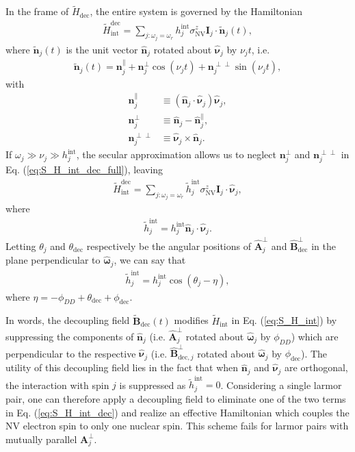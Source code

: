 \documentclass[twocolumn]{revtex4-1}
\renewcommand{\t}{\text} %
\newcommand{\p}[1]{\left(#1\right)} %
\renewcommand{\v}{\bm} %
\newcommand{\uv}[1]{\hat{\v{#1}}} %
\renewcommand{\c}{\cdot} %
\newcommand{\NV}{\t{NV}}
\begin{document}
In the frame of $\tilde H_{\t{dec}}$, the entire system is governed by
the Hamiltonian
\begin{align}
  \tilde H_{\t{int}}^{\t{dec}} = \sum_{j:\omega_j=\omega_r}
  h_j^{\t{int}}\sigma_\NV^z\v I_j\c\tilde{\v n}_j\p{t},
  \label{eq:S_H_int_dec_full}
\end{align}
where $\tilde{\v n}_j\p{t}$ is the unit vector $\uv n_j$ rotated about
$\uv\nu_j$ by $\nu_jt$, i.e.
\begin{align}
  \tilde{\v n}_j\p{t} = \v n_j^\parallel +
  \v n_j^\perp\cos\p{\nu_jt} + \v n_j^{\perp\perp}\sin\p{\nu_jt},
\end{align}
with
\begin{align}
  \v n_j^\parallel &\equiv \p{\uv n_j\c\uv\nu_j}\uv\nu_j, \\
  \v n_j^\perp &\equiv \uv n_j - \uv n_j^\parallel, \\
  \v n_j^{\perp\perp} &\equiv \uv\nu_j\times\uv n_j.
\end{align}
If $\omega_j\gg\nu_j\gg h_j^{\t{int}}$, the secular approximation
allows us to neglect $\v n_j^\perp$ and $\v n_j^{\perp\perp}$ in
Eq. (\ref{eq:S_H_int_dec_full}), leaving
\begin{align}
  \tilde H_{\t{int}}^{\t{dec}}
  = \sum_{j:\omega_j=\omega_r}
  \tilde h_j^{\t{int}}\sigma_\NV^z\v I_j\c\uv\nu_j,
  \label{eq:S_H_int_dec}
\end{align}
where
\begin{align}
  \tilde h_j^{\t{int}}
  = h_j^{\t{int}}\uv n_j\c\uv\nu_j.
\end{align}
Letting $\theta_j$ and $\theta_{\t{dec}}$ respectively be the angular
positions of $\uv A_j^\perp$ and $\uv B_{\t{dec}}^\perp$ in the plane
perpendicular to $\uv\omega_j$, we can say that
\begin{align}
  \tilde h_j^{\t{int}} = h_j^{\t{int}}\cos\p{\theta_j-\eta},
\end{align}
where $\eta=-\phi_{DD}+\theta_{\t{dec}}+\phi_{\t{dec}}$.

In words, the decoupling field $\tilde{\v B}_{\t{dec}}\p{t}$ modifies
$\tilde H_{\t{int}}$ in Eq. (\ref{eq:S_H_int}) by suppressing the
components of $\uv n_j$ (i.e. $\uv A_j^\perp$ rotated about
$\uv\omega_j$ by $\phi_{DD}$) which are perpendicular to the
respective $\uv\nu_j$ (i.e.  $\uv B_{\t{dec},j}^\perp$ rotated about
$\uv\omega_j$ by $\phi_{\t{dec}}$). The utility of this decoupling
field lies in the fact that when $\uv n_j$ and $\uv\nu_j$ are
orthogonal, the interaction with spin $j$ is suppressed as
$\tilde h_j^{\t{int}}=0$. Considering a single larmor pair, one can
therefore apply a decoupling field to eliminate one of the two terms
in Eq. (\ref{eq:S_H_int_dec}) and realize an effective Hamiltonian
which couples the NV electron spin to only one nuclear spin. This
scheme fails for larmor pairs with mutually parallel $\v A_j^\perp$.
\end{document}
